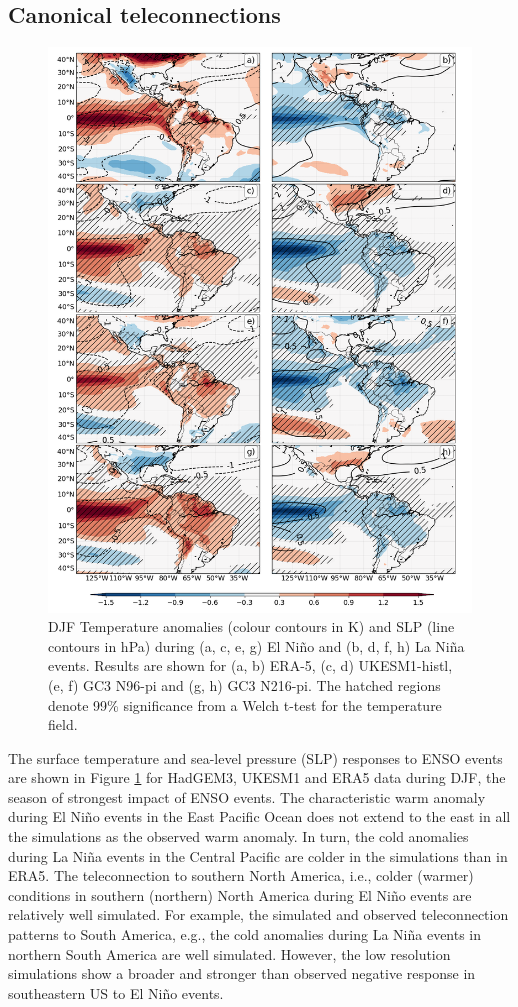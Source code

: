 \subsection{Canonical teleconnections}

\begin{figure}[t!]
\centering
 \includegraphics[width=0.81\linewidth]{figures/ensotemp_3}
\caption{ DJF Temperature anomalies (colour contours in K) and SLP (line contours in hPa) during (a, c, e, g) El Ni\~no and (b, d, f, h) La Ni\~na events. Results are shown for (a, b) ERA-5, (c, d) UKESM1-histl, (e, f) GC3 N96-pi and (g, h) GC3 N216-pi. The hatched regions denote 99\% significance from a Welch t-test for the temperature field. }
\label{fig:10}
\end{figure}

The surface temperature and sea-level pressure (SLP) responses to ENSO events are shown in Figure \ref{fig:10} for HadGEM3, UKESM1 and ERA5 data during DJF, the season of strongest impact of ENSO events.
The characteristic warm anomaly during El Ni\~no events in the East Pacific Ocean does not extend to the east in all the simulations as the observed warm anomaly. In turn, the cold anomalies during La Ni\~na events in the Central Pacific are colder in the simulations than in ERA5. 
The teleconnection to southern North America, i.e., colder (warmer) conditions in southern (northern) North America during El Ni\~no events are relatively well simulated. For example, the simulated and observed teleconnection patterns to South America, e.g., the cold anomalies during La Ni\~na events in northern South America are well simulated. However, the low resolution simulations show a broader and stronger than observed negative response in southeastern US to El Ni\~no events. 

